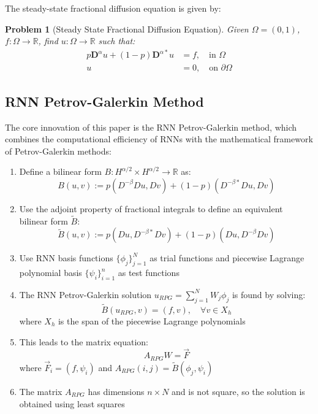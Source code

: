 \documentclass[11pt]{article}
\newtheorem{problem}{Problem}
\begin{document}
The steady-state fractional diffusion equation is given by:
\begin{problem}[Steady State Fractional Diffusion Equation]
Given $\Omega = (0,1)$, $f: \Omega \rightarrow \mathbb{R}$, find $u: \Omega \rightarrow \mathbb{R}$ such that:
\begin{align}
p\mathbf{D}^\alpha u + (1-p)\mathbf{D}^{\alpha*}u &= f, \quad \text{in } \Omega \\
u &= 0, \quad \text{on } \partial\Omega
\end{align}
\end{problem}

\subsection{RNN Petrov-Galerkin Method}

The core innovation of this paper is the RNN Petrov-Galerkin method, which combines the computational efficiency of RNNs with the mathematical framework of Petrov-Galerkin methods:

\begin{enumerate}
    \item Define a bilinear form $B: H^{\alpha/2} \times H^{\alpha/2} \rightarrow \mathbb{R}$ as:
    \begin{equation}
    B(u,v) := p(D^{-\beta}Du, Dv) + (1-p)(D^{-\beta*}Du, Dv)
    \end{equation}
    
    \item Use the adjoint property of fractional integrals to define an equivalent bilinear form $\tilde{B}$:
    \begin{equation}
    \tilde{B}(u,v) := p(Du, D^{-\beta*}Dv) + (1-p)(Du, D^{-\beta}Dv)
    \end{equation}
    
    \item Use RNN basis functions $\{\phi_j\}_{j=1}^N$ as trial functions and piecewise Lagrange polynomial basis $\{\psi_i\}_{i=1}^n$ as test functions
    
    \item The RNN Petrov-Galerkin solution $u_{RPG} = \sum_{j=1}^N W_j\phi_j$ is found by solving:
    \begin{equation}
    \tilde{B}(u_{RPG}, v) = (f,v), \quad \forall v \in X_h
    \end{equation}
    where $X_h$ is the span of the piecewise Lagrange polynomials
    
    \item This leads to the matrix equation:
    \begin{equation}
    A_{RPG}W = \vec{F}
    \end{equation}
    where $\vec{F}_i = (f, \psi_i)$ and $A_{RPG}(i,j) = \tilde{B}(\phi_j, \psi_i)$
    
    \item The matrix $A_{RPG}$ has dimensions $n \times N$ and is not square, so the solution is obtained using least squares
\end{enumerate}
\end{document}
